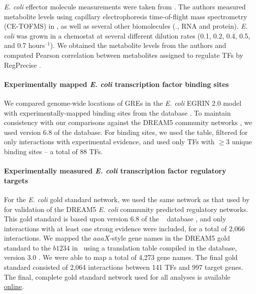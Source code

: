 {\it E. coli} effector molecule measurements were taken from \cite{ishii_multiple_2007}. The authors measured metabolite levels using capillary electrophoresis time-of-flight mass spectrometry (CE-TOFMS) in \eco, as well as several other biomolecules (\eg., RNA and protein). \textit{E. coli} was grown in a chemostat at several different dilution rates (0.1, 0.2, 0.4, 0.5, and 0.7 hours$^{–1}$). We obtained the metabolite levels from the authors and computed Pearson correlation between metabolites assigned to regulate TFs by RegPrecise \cite{novichkov_regpredict:_2010}.

\paragraph{Experimentally mapped {\it E. coli} transcription factor binding sites}

We compared genome-wide locations of GREs in the {\it E. coli} EGRIN 2.0 model with experimentally-mapped binding sites from the \rdb database \cite{gama-castro_regulondb_2011}. To maintain consistency with our comparisons against the DREAM5 community networks \cite{marbach_wisdom_2012}, we used version 6.8 of the database. For binding sites, we used the {} table, filtered for only interactions with experimental evidence, and used only TFs with $\geq 3$ unique binding sites -- a total of 88 TFs.

\paragraph{Experimentally measured {\it E. coli} transcription factor regulatory targets}
\label{section:eco:gold:standard}

For the {\it E. coli} gold standard network, we used the same network as that used by \cite{marbach_wisdom_2012} for validation of the DREAM5 {\it E. coli} community predicted regulatory networks. This gold standard is based upon version 6.8 of the \rdb~ database \cite{gama-castro_regulondb_2011}, and only interactions with at least one strong evidence were included, for a total of 2,066 interactions. We mapped the $aaaX$-style gene names in the DREAM5 gold standard to the $b1234$ in \cm~using a translation table compiled in the {} database, version 3.0 \cite{zhou_ecogene_2013}. We were able to map a total of 4,273 gene names. The final gold standard consisted of 2,064 interactions between 141 TFs and 997 target genes. The final, complete gold standard network used for all analyses is available \href{http://egrin2.systemsbiology.net/}{online}.

